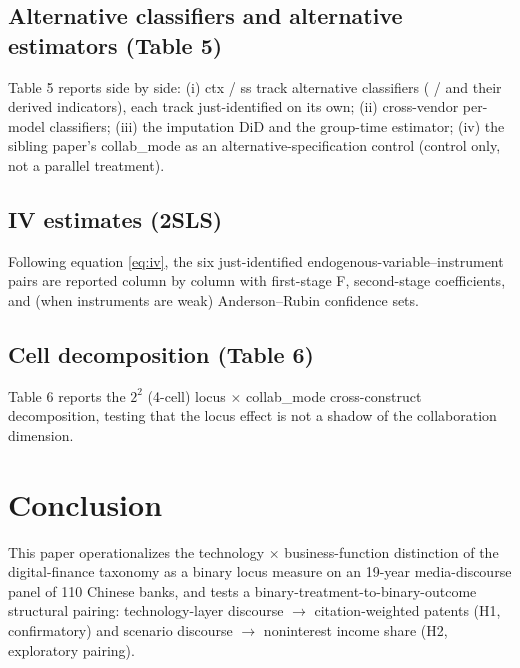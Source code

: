 \subsection{Alternative classifiers and alternative estimators (Table 5)}

Table 5 reports side by side: (i) ctx / ss track alternative classifiers
( /  and their derived indicators), each track
just-identified on its own; (ii) cross-vendor per-model classifiers; (iii) the
\textcite{borusyak2024revisiting} imputation DiD and the
\textcite{callaway2021difference} group-time estimator; (iv) the sibling paper's
collab\_mode as an alternative-specification control (control only, not a parallel
treatment). 

\subsection{IV estimates (2SLS)}

Following equation \eqref{eq:iv}, the six just-identified
endogenous-variable--instrument pairs are reported column by column with first-stage F,
second-stage coefficients, and (when instruments are weak) Anderson--Rubin confidence
sets. 

\subsection{Cell decomposition (Table 6)}

Table 6 reports the $2^2$ (4-cell) locus $\times$ collab\_mode cross-construct
decomposition, testing that the locus effect is not a shadow of the collaboration
dimension. 

\section{Conclusion}\label{sec:conclusion}

This paper operationalizes the technology $\times$ business-function distinction of the
digital-finance taxonomy \parencite{gomber2017cube} as a binary locus measure on an
19-year media-discourse panel of 110 Chinese banks, and tests a
binary-treatment-to-binary-outcome structural pairing: technology-layer discourse
$\to$ citation-weighted patents (H1, confirmatory) and scenario discourse $\to$
noninterest income share (H2, exploratory pairing). 

